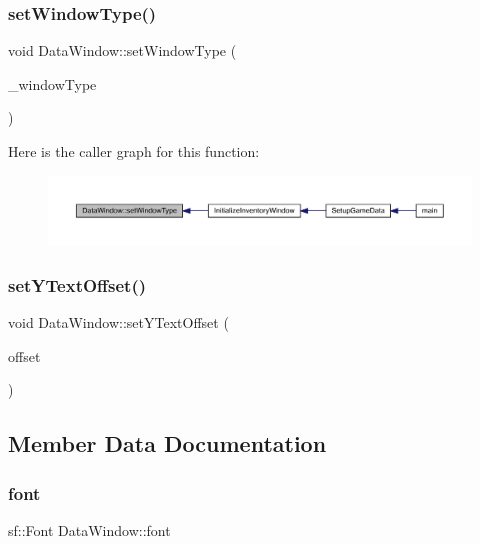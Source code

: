 \subsubsection{\texorpdfstring{set\+Window\+Type()}{setWindowType()}}
{\footnotesize\ttfamily void Data\+Window\+::set\+Window\+Type (\begin{DoxyParamCaption}\item[{\mbox{\hyperlink{_data_window_8hpp_a3c1e0c6fe947fdbea7502497b27cf44d}{En\+Data\+Window\+Type}}}]{\+\_\+window\+Type }\end{DoxyParamCaption})}

Here is the caller graph for this function\+:
\nopagebreak
\begin{figure}[H]
\begin{center}
\leavevmode
\includegraphics[width=350pt]{class_data_window_acd1f484d18f8f32d419d23e05e89ea31_icgraph}
\end{center}
\end{figure}
\mbox{\label{class_data_window_a48139ad5b1c02366b1f29498839da434}} 
\subsubsection{\texorpdfstring{set\+Y\+Text\+Offset()}{setYTextOffset()}}
{\footnotesize\ttfamily void Data\+Window\+::set\+Y\+Text\+Offset (\begin{DoxyParamCaption}\item[{float}]{offset }\end{DoxyParamCaption})}



\subsection{Member Data Documentation}
\mbox{\label{class_data_window_a7c7064e5c2cef5bd663dd1d6b304a59f}} 
\subsubsection{\texorpdfstring{font}{font}}
{\footnotesize\ttfamily sf\+::\+Font Data\+Window\+::font\hspace{0.3cm}{\ttfamily [private]}}

